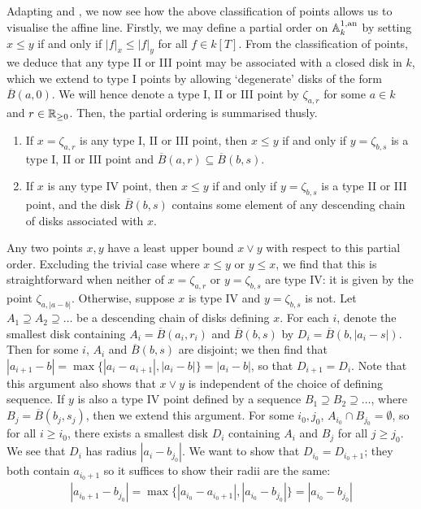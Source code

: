 Adapting \parencite{bakernotes} and \parencite[Thm. 4.2.1]{berk1}, we now see how the above classification of points allows us to visualise the affine line.
Firstly, we may define a partial order on $\mathbb{A}^{1, \text{an}}_{k}$ by setting $x \leq y$ if and only if $|f|_x \leq |f|_y$ for all $f \in k[T]$. From the classification of points, we deduce that any type II or III point may be associated with a closed disk in $k$, which we extend to type I points by allowing `degenerate' disks of the form $\overline B(a, 0)$. We will hence denote a type I, II or III point by $\zeta_{a, r}$ for some $a \in k$ and $r \in \mathbb{R}_{\geq 0}$. Then, the partial ordering is summarised thusly.
\begin{enumerate}
    \item If $x = \zeta_{a, r}$ is any type I, II or III point, then $x \leq y$ if and only if $y = \zeta_{b, s}$ is a type I, II or III point and $\overline B(a, r) \subseteq \overline B(b, s)$.
    \item If $x$ is any type IV point, then $x \leq y$ if and only if $y = \zeta_{b, s}$ is a type II or III point, and the disk $\overline B(b, s)$ contains some element of any descending chain of disks associated with $x$.
\end{enumerate}
Any two points $x, y$ have a least upper bound $x \lor y$ with respect to this partial order. Excluding the trivial case where $x \leq y$ or $y \leq x$, we find that this is straightforward when neither of $x = \zeta_{a, r}$ or $y = \zeta_{b, s}$ are type IV: it is given by the point $\zeta_{a, |a - b|}$. Otherwise, suppose $x$ is type IV and $y = \zeta_{b, s}$ is not. Let $A_1 \supseteq A_2 \supseteq \dots$ be a descending chain of disks defining $x$.
For each $i$, denote the smallest disk containing $A_i = \overline B(a_i, r_i)$ and $\overline B(b, s)$ by $D_{i} = \overline B(b, |a_i - s|)$. 
Then for some $i$, $A_i$ and $\overline B(b, s)$ are disjoint; we then find that $|a_{i + 1} - b| = \max \{|a_i - a_{i + 1}|, |a_i - b|\} = |a_i - b|$, so that $D_{i+1} = D_{i}$. 
Note that this argument also shows that $x \lor y$ is independent of the choice of defining sequence.
If $y$ is also a type IV point defined by a sequence $B_1 \supseteq B_2 \supseteq \dots$, where $B_j = \overline B(b_j, s_j)$, then we extend this argument. 
For some $i_0, j_0$, $A_{i_0} \cap B_{j_0} = \emptyset$, so for all $i \geq i_0$, there exists a smallest disk $D_{i}$ containing $A_i$ and $B_j$ for all $j \geq j_0$. We see that $D_{i}$ has radius $|a_i - b_{j_0}|$. We want to show that $D_{i_0} = D_{i_0 + 1}$; they both contain $a_{i_0 + 1}$ so it suffices to show their radii are the same:
\begin{align*}
    |a_{i_0 + 1} - b_{j_0}| = \max \{|a_{i_0} - a_{i_0 + 1}|, |a_{i_0} - b_{j_0}| \} = |a_{i_0} - b_{j_0}|
\end{align*}

